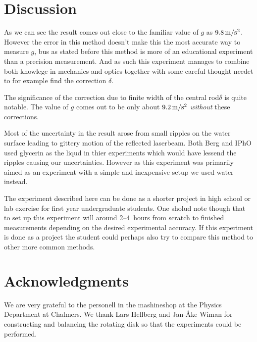 \documentclass[11pt,towcolumn, swedish, english]{article}
\begin{document}
\section{Discussion}
As we can see the result comes out close to the familiar value of $g$
as $\unit[9.8]{m/s^2}$. However the error in this method doesn't make
this the most accurate way to measure $g$, bus as stated before this
method is more of an educational experiment than a precision
measurement. And as such this experiment manages to combine both
knowlege in mechanics and optics together with some careful thought
needet to for example find the correction $\delta$.


The significance of the correction due to finite width of the central
rod$\delta$ is quite notable. The value of $g$ comes out to be only
about $\unit[9.2]{m/s^2}$ \emph{without} these corrections. 

Most of the uncertainty in the result arose from small ripples on the
water surface leading to gittery motion of the reflected
laserbeam. Both Berg\cite{Berg1990} and IPhO\cite{IPhO2001} used
glycerin as the liqud in thier experiments which would have lessend
the ripples causing our uncertainties. However as this experiment was
primarily aimed as an experiment with a simple and inexpensive setup
we used water instead. 

The experiment described here can be done as a shorter project in high
school or lab exercise for first year undergraduate students. One
sholud note though that to set up this experiment will around
2--4~hours from scratch to finished measurements depending on the
desired experimental accuracy. If this experiment is done as a project
the student could perhaps also try to compare this method to other
more common methods.


\section*{Acknowledgments}
We are very grateful to the personell in the mashineshop at the
Physics Department at Chalmers. We thank Lars Hellberg and Jan-Åke
Wiman for constructing and balancing the rotating disk so that the
experiments could be performed. 





\end{document}
